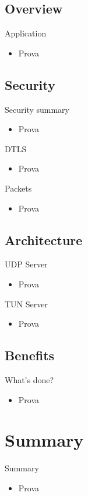 \documentclass{beamer}
\begin{document}
\subsection{Overview}
\begin{frame}{Application}
	\begin{itemize}
	\item Prova
	\end{itemize}
\end{frame}
\subsection{Security}
\begin{frame}{Security summary}
	\begin{itemize}
	\item Prova
	\end{itemize}
\end{frame}
\begin{frame}{DTLS}
	\begin{itemize}
	\item Prova
	\end{itemize}
\end{frame}
\begin{frame}{Packets}
	\begin{itemize}
	\item Prova
	\end{itemize}
\end{frame}
\subsection{Architecture}
\begin{frame}{UDP Server}
	\begin{itemize}
	\item Prova
	\end{itemize}
\end{frame}
\begin{frame}{TUN Server}
	\begin{itemize}
	\item Prova
	\end{itemize}
\end{frame}
\subsection{Benefits}
\begin{frame}{What's done?}
	\begin{itemize}
	\item Prova
	\end{itemize}
\end{frame}

\section*{Summary}
\begin{frame}{Summary}
	\begin{itemize}
	\item \alert{Prova}
	\end{itemize}
\end{frame}
\end{document}
